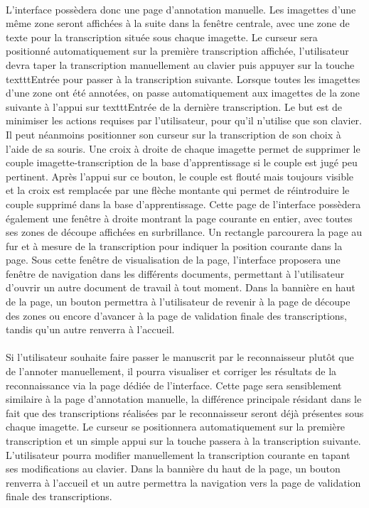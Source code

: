 \paragraph{}
L’interface possèdera donc une page d’annotation manuelle. Les imagettes d’une même zone seront affichées à la suite dans la fenêtre centrale, avec une zone de texte pour la transcription située sous chaque imagette. Le curseur sera positionné automatiquement sur la première transcription affichée, l’utilisateur devra taper la transcription manuellement au clavier puis appuyer sur la touche texttt{Entrée} pour passer à la transcription suivante. Lorsque toutes les imagettes d’une zone ont été annotées, on passe automatiquement aux imagettes de la zone suivante à l’appui sur texttt{Entrée} de la dernière transcription. Le but est de minimiser les actions requises par l’utilisateur, pour qu’il n’utilise que son clavier. Il peut néanmoins positionner son curseur sur la transcription de son choix à l’aide de sa souris.
Une croix à droite de chaque imagette permet de supprimer le couple imagette-transcription de la base d’apprentissage si le couple est jugé peu pertinent. Après l’appui sur ce bouton, le couple est flouté mais toujours visible et la croix est remplacée par une flèche montante qui permet de réintroduire le couple supprimé dans la base d’apprentissage.
Cette page de l’interface possèdera également une fenêtre à droite montrant la page courante en entier, avec toutes ses zones de découpe affichées en surbrillance. Un rectangle parcourera la page au fur et à mesure de la transcription pour indiquer la position courante dans la page.
Sous cette fenêtre de visualisation de la page, l’interface proposera une fenêtre de navigation dans les différents documents, permettant à l’utilisateur d’ouvrir un autre document de travail à tout moment.
Dans la bannière en haut de la page, un bouton permettra à l’utilisateur de revenir à la page de découpe des zones ou encore d’avancer à la page de validation finale des transcriptions, tandis qu’un autre renverra à l’accueil.


\paragraph{}
Si l’utilisateur souhaite faire passer le manuscrit par le reconnaisseur plutôt que de l’annoter manuellement, il pourra visualiser et corriger les résultats de la reconnaissance via la page dédiée de l’interface. Cette page sera sensiblement similaire à la page d’annotation manuelle, la différence principale résidant dans le fait que des transcriptions réalisées par le reconnaisseur seront déjà présentes sous chaque imagette. Le curseur se positionnera automatiquement sur la première transcription et un simple appui sur la touche  passera à la transcription suivante. L’utilisateur pourra modifier manuellement la transcription courante en tapant ses modifications au clavier.
Dans la bannière du haut de la page, un bouton renverra à l’accueil et un autre permettra la navigation vers la page de validation finale des transcriptions.

